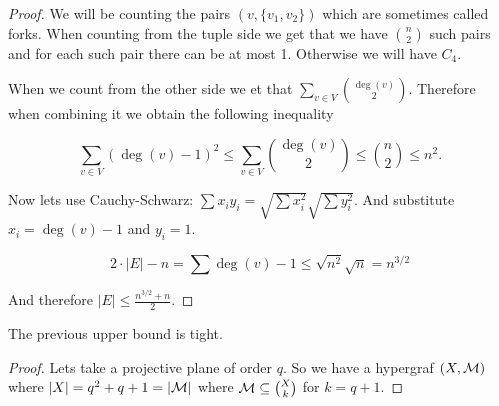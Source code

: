 \begin{proof}
	We will be counting the pairs $(v, \{v_1,v_2\})$ which are sometimes called forks. When counting from the tuple side we get that we have $\binom{n}{2}$ such pairs and for each such pair there can be at most 1. Otherwise we will have $C_4$.
	
	When we count from the other side we et that $\sum_{v \in V} \binom{\deg(v)}{2}$. Therefore when combining it we obtain the following inequality
	
	$$
	\sum_{v \in V} (\deg(v) -1)^2 \leq \sum_{v \in V} \binom{\deg(v)}{2} \leq \binom{n}{2} \leq n^2.
	$$
	
	Now lets use Cauchy-Schwarz: $\sum x_i y_i = \sqrt{\sum x_i^2} \sqrt{\sum y_i^2}$. And substitute $x_i = \deg(v) -1$ and $y_i = 1$.
	
	$$
	2 \cdot |E| - n = \sum \deg(v) - 1 \leq \sqrt{n^2} \sqrt{n} = n^{3/2}
	$$
	
	And therefore $|E| \leq \frac{n^{3/2} + n}{2}$.
\end{proof}

\begin{prop}
	The previous upper bound is tight.
\end{prop}

\begin{proof}
	Lets take a projective plane of order $q$. So we have a hypergraf $(X, \mathcal{M})$ where $|X| = q^2 + q + 1 = |\mathcal{M}|$ where $\mathcal{M} \subseteq \binom{X}{k}$ for $k = q +1$.
	
\end{proof}